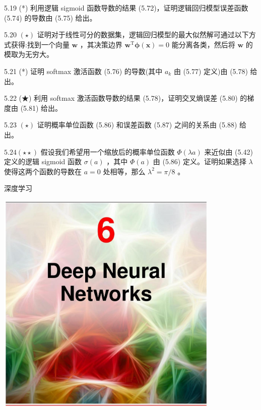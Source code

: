 \documentclass[10pt]{article}
\begin{document}
5.19 (*) 利用逻辑 sigmoid 函数导数的结果 (5.72)，证明逻辑回归模型误差函数 (5.74) 的导数由 (5.75) 给出。

5.20 \(\left( \star \right)\) 证明对于线性可分的数据集，逻辑回归模型的最大似然解可通过以下方式获得:找到一个向量 \(\mathbf{w}\) ，其决策边界 \({\mathbf{w}}^{\mathrm{T}}\mathbf{\phi }\left( \mathbf{x}\right)  = 0\) 能分离各类，然后将 \(\mathbf{w}\) 的模取为无穷大。

5.21 (*) 证明 softmax 激活函数 (5.76) 的导数(其中 \({a}_{k}\) 由 (5.77) 定义)由 (5.78) 给出。

5.22 (★) 利用 softmax 激活函数导数的结果 (5.78)，证明交叉熵误差 (5.80) 的梯度由 (5.81) 给出。

5.23 \(\left( \star \right)\) 证明概率单位函数 (5.86) 和误差函数 (5.87) 之间的关系由 (5.88) 给出。

\({5.24}\left( {\star  \star  }\right)\) 假设我们希望用一个缩放后的概率单位函数 \(\Phi \left( {\lambda a}\right)\) 来近似由 (5.42) 定义的逻辑 sigmoid 函数 \(\sigma \left( a\right)\) ，其中 \(\Phi \left( a\right)\) 由 (5.86) 定义。证明如果选择 \(\lambda\) 使得这两个函数的导数在 \(a = 0\) 处相等，那么 \({\lambda }^{2} = \pi /8\) 。

深度学习

\begin{center}
\includegraphics[max width=0.8\textwidth]{images/0194e279-9b28-703a-88f4-c3ac21e2010d_190_473_349_1075_1088_0.jpg}
\end{center}
\hspace*{3em} 
\end{document}
